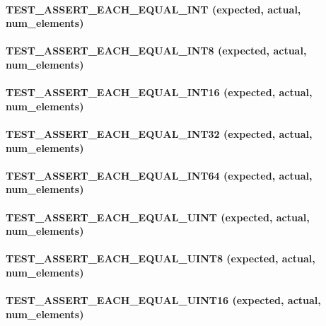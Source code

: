 \paragraph*{{\ttfamily T\+E\+S\+T\+\_\+\+A\+S\+S\+E\+R\+T\+\_\+\+E\+A\+C\+H\+\_\+\+E\+Q\+U\+A\+L\+\_\+\+I\+NT (expected, actual, num\+\_\+elements)}}

\paragraph*{{\ttfamily T\+E\+S\+T\+\_\+\+A\+S\+S\+E\+R\+T\+\_\+\+E\+A\+C\+H\+\_\+\+E\+Q\+U\+A\+L\+\_\+\+I\+N\+T8 (expected, actual, num\+\_\+elements)}}

\paragraph*{{\ttfamily T\+E\+S\+T\+\_\+\+A\+S\+S\+E\+R\+T\+\_\+\+E\+A\+C\+H\+\_\+\+E\+Q\+U\+A\+L\+\_\+\+I\+N\+T16 (expected, actual, num\+\_\+elements)}}

\paragraph*{{\ttfamily T\+E\+S\+T\+\_\+\+A\+S\+S\+E\+R\+T\+\_\+\+E\+A\+C\+H\+\_\+\+E\+Q\+U\+A\+L\+\_\+\+I\+N\+T32 (expected, actual, num\+\_\+elements)}}

\paragraph*{{\ttfamily T\+E\+S\+T\+\_\+\+A\+S\+S\+E\+R\+T\+\_\+\+E\+A\+C\+H\+\_\+\+E\+Q\+U\+A\+L\+\_\+\+I\+N\+T64 (expected, actual, num\+\_\+elements)}}

\paragraph*{{\ttfamily T\+E\+S\+T\+\_\+\+A\+S\+S\+E\+R\+T\+\_\+\+E\+A\+C\+H\+\_\+\+E\+Q\+U\+A\+L\+\_\+\+U\+I\+NT (expected, actual, num\+\_\+elements)}}

\paragraph*{{\ttfamily T\+E\+S\+T\+\_\+\+A\+S\+S\+E\+R\+T\+\_\+\+E\+A\+C\+H\+\_\+\+E\+Q\+U\+A\+L\+\_\+\+U\+I\+N\+T8 (expected, actual, num\+\_\+elements)}}

\paragraph*{{\ttfamily T\+E\+S\+T\+\_\+\+A\+S\+S\+E\+R\+T\+\_\+\+E\+A\+C\+H\+\_\+\+E\+Q\+U\+A\+L\+\_\+\+U\+I\+N\+T16 (expected, actual, num\+\_\+elements)}}

